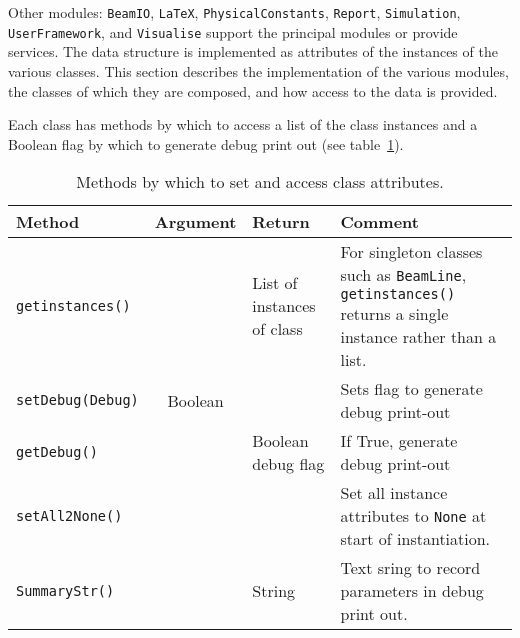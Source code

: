 Other modules: \texttt{BeamIO}, \texttt{LaTeX},
\texttt{PhysicalConstants}, \texttt{Report}, \texttt{Simulation},
\texttt{UserFramework}, and \texttt{Visualise}
support the principal modules or provide services.
The data structure is implemented as attributes of the instances of the 
various classes.
This section describes the implementation of the various modules, the
classes of which they are composed, and how access to the data is
provided.

Each class has methods by which to access a list of the class
instances and a Boolean flag by which to generate debug print out (see
table~\ref{Tab:ClassAttributeAccess}).
\begin{table}[h]
  \caption{Methods by which to set and access class attributes.}
  \label{Tab:ClassAttributeAccess}
  \begin{center}
    \begin{tabular}{|l|c|l|p{7cm}|}
      \hline
      \textbf{Method}          & \textbf{Argument} & \textbf{Return}            & \textbf{Comment}                      \\
      \hline
      \texttt{getinstances()}  &                   & List of instances of class & For singleton classes such as
                                                                                  \texttt{BeamLine}, \texttt{getinstances()}
                                                                                  returns a single instance rather than a list. \\
      \texttt{setDebug(Debug)} & Boolean           &                            & Sets flag to generate debug print-out \\
      \texttt{getDebug()}      &                   & Boolean debug flag         & If True, generate debug print-out     \\
      \texttt{setAll2None()}   &                   &                            & Set all instance attributes to
                                                                                  \texttt{None} at start of instantiation. \\
      \texttt{SummaryStr()}    &                   & String                     & Text sring to record parameters in debug
                                                                                  print out. \\
      \hline
    \end{tabular}
  \end{center}
\end{table}

